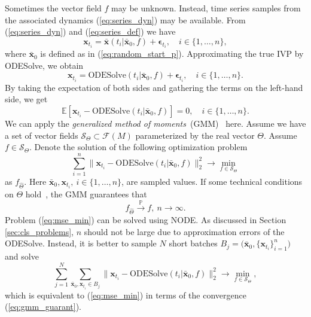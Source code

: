 \documentclass[referee, pdflatex, sn-mathphys-num]{sn-jnl}
\theoremstyle{definition}
\theoremstyle{plain}
\newcommand{\bx}{\ensuremath{\mathbf{x}}}
\newcommand{\bbx}{\ensuremath{\bar{\mathbf{x}}}}
\newcommand{\beps}{\ensuremath{\boldsymbol{\epsilon}}}
\begin{document}
	Sometimes the vector field $f$ may be unknown. Instead, time series samples from the associated dynamics (\ref{eq:series_dyn}) may be available. From (\ref{eq:series_dyn}) and (\ref{eq:series_def}) we have
	\begin{equation*}
		\bx_{t_i} = \bbx(t_i | \bbx_0, f) + \beps_{t_i}, \quad i \in \{1, \ldots, n\},
	\end{equation*}
	where $\bbx_0$ is defined as in (\ref{eq:random_start_p}). Approximating the true IVP by ODESolve, we obtain
	\begin{equation*}
		\bx_{t_i} =  \text{ODESolve}(t_i | \bbx_0, f) + \beps_{t_i}, \quad i \in \{1, \ldots, n\}.
	\end{equation*}
	By taking the expectation of both sides and gathering the terms on the left-hand side, we get
	\begin{equation*}
		\mathbb{E} \left[ \bx_{t_i} -  \text{ODESolve}(t_i | \bbx_0, f) \right]  = 0, \quad i \in \{1, \ldots, n\}.
	\end{equation*}
	We can apply the \emph{generalized method of moments}~(GMM)~\cite{gmm_hansen} here. Assume we have a set of vector fields $\mathcal{S}_{\Theta} \subset \mathcal{F}(M)$ parameterized by the real vector $\Theta$. Assume $f \in \mathcal{S}_{\Theta}$. Denote the solution of the following optimization problem
	\begin{equation}\label{eq:mse_min}
		\sum\limits_{i=1}^n \big\lVert  \bx_{t_i} -  \text{ODESolve}(t_i | \bbx_0, f) \big\rVert_2^2 \to \underset{f \in \mathcal{S}_{\Theta}}{\min}
	\end{equation}
	as $f_{\hat{\Theta}}$. Here $\bbx_0, \bx_{t_i}, \ i \in \{1, \ldots, n\}$, are sampled values. If some technical conditions on $\Theta$ hold~\cite{gmm_hansen}, the GMM guarantees that
	\begin{equation}\label{eq:gmm_guarant}
		f_{\hat{\Theta}} \xrightarrow{\mathbb{P}} f, \ n \to \infty.
	\end{equation}
	Problem (\ref{eq:mse_min}) can be solved using NODE. As discussed in Section \ref{sec:cls_problems}, $n$ should not be large due to approximation errors of the ODESolve. Instead, it is better to sample $N$ short batches $ B_j = \big( \bbx_0, \{\bx_{t_i} \}_{i=1}^n \big)$ and solve
	\begin{equation}\label{eq:mse_min_batch}
		\sum\limits_{j=1}^N \sum\limits_{\bbx_0, \bx_{t_i} \in B_j} \big\lVert  \bx_{t_i} -  \text{ODESolve}(t_i | \bbx_0, f) \big\rVert_2^2 \to \underset{f \in \mathcal{S}_{\Theta}}{\min},
	\end{equation}
	which is equivalent to (\ref{eq:mse_min}) in terms of the convergence (\ref{eq:gmm_guarant}).
	
\end{document}
